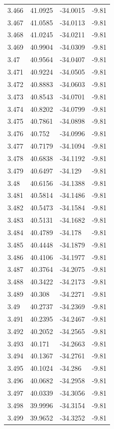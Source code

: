 \begin{tabular}{llll}
3.466 & 41.0925 & -34.0015 & -9.81 \\
3.467 & 41.0585 & -34.0113 & -9.81 \\
3.468 & 41.0245 & -34.0211 & -9.81 \\
3.469 & 40.9904 & -34.0309 & -9.81 \\
3.47 & 40.9564 & -34.0407 & -9.81 \\
3.471 & 40.9224 & -34.0505 & -9.81 \\
3.472 & 40.8883 & -34.0603 & -9.81 \\
3.473 & 40.8543 & -34.0701 & -9.81 \\
3.474 & 40.8202 & -34.0799 & -9.81 \\
3.475 & 40.7861 & -34.0898 & -9.81 \\
3.476 & 40.752 & -34.0996 & -9.81 \\
3.477 & 40.7179 & -34.1094 & -9.81 \\
3.478 & 40.6838 & -34.1192 & -9.81 \\
3.479 & 40.6497 & -34.129 & -9.81 \\
3.48 & 40.6156 & -34.1388 & -9.81 \\
3.481 & 40.5814 & -34.1486 & -9.81 \\
3.482 & 40.5473 & -34.1584 & -9.81 \\
3.483 & 40.5131 & -34.1682 & -9.81 \\
3.484 & 40.4789 & -34.178 & -9.81 \\
3.485 & 40.4448 & -34.1879 & -9.81 \\
3.486 & 40.4106 & -34.1977 & -9.81 \\
3.487 & 40.3764 & -34.2075 & -9.81 \\
3.488 & 40.3422 & -34.2173 & -9.81 \\
3.489 & 40.308 & -34.2271 & -9.81 \\
3.49 & 40.2737 & -34.2369 & -9.81 \\
3.491 & 40.2395 & -34.2467 & -9.81 \\
3.492 & 40.2052 & -34.2565 & -9.81 \\
3.493 & 40.171 & -34.2663 & -9.81 \\
3.494 & 40.1367 & -34.2761 & -9.81 \\
3.495 & 40.1024 & -34.286 & -9.81 \\
3.496 & 40.0682 & -34.2958 & -9.81 \\
3.497 & 40.0339 & -34.3056 & -9.81 \\
3.498 & 39.9996 & -34.3154 & -9.81 \\
3.499 & 39.9652 & -34.3252 & -9.81 \\

\end{tabular}
